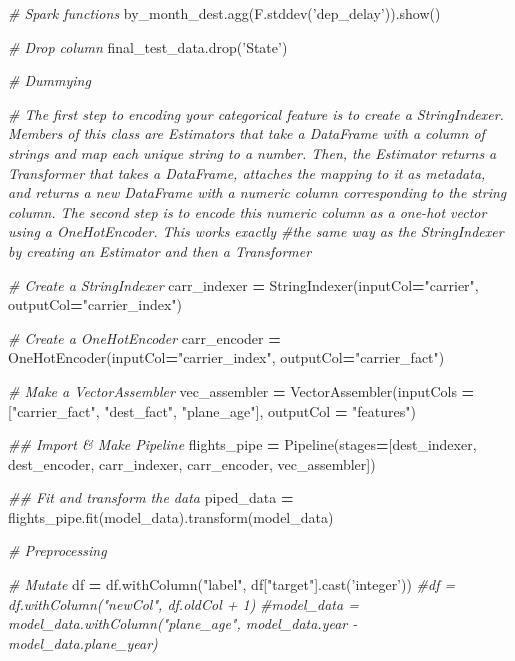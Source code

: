 \documentclass[]{book}
\newenvironment{Shaded}{\begin{snugshade}}{\end{snugshade}}
\newcommand{\CommentTok}[1]{\textcolor[rgb]{0.56,0.35,0.01}{\textit{#1}}}
\newcommand{\NormalTok}[1]{#1}
\newcommand{\OperatorTok}[1]{\textcolor[rgb]{0.81,0.36,0.00}{\textbf{#1}}}
\newcommand{\StringTok}[1]{\textcolor[rgb]{0.31,0.60,0.02}{#1}}
\begin{document}
\begin{Shaded}
\begin{Highlighting}[]
\CommentTok{# Spark functions}
\NormalTok{by_month_dest.agg(F.stddev(}\StringTok{'dep_delay'}\NormalTok{)).show()}

\CommentTok{# Drop column}
\NormalTok{final_test_data.drop(}\StringTok{'State'}\NormalTok{)}

\CommentTok{# Dummying}

\CommentTok{# The first step to encoding your categorical feature is to create a StringIndexer. Members of this class are Estimators that take a DataFrame with a column of strings and map each unique string to a number. Then, the Estimator returns a Transformer that takes a DataFrame, attaches the mapping to it as metadata, and returns a new DataFrame with a numeric column corresponding to the string column. The second step is to encode this numeric column as a one-hot vector using a OneHotEncoder. This works exactly #the same way as the StringIndexer by creating an Estimator and then a Transformer}

\CommentTok{# Create a StringIndexer}
\NormalTok{carr_indexer }\OperatorTok{=}\NormalTok{ StringIndexer(inputCol}\OperatorTok{=}\StringTok{"carrier"}\NormalTok{, outputCol}\OperatorTok{=}\StringTok{"carrier_index"}\NormalTok{)}

\CommentTok{# Create a OneHotEncoder}
\NormalTok{carr_encoder }\OperatorTok{=}\NormalTok{ OneHotEncoder(inputCol}\OperatorTok{=}\StringTok{"carrier_index"}\NormalTok{, outputCol}\OperatorTok{=}\StringTok{"carrier_fact"}\NormalTok{)}

\CommentTok{# Make a VectorAssembler}
\NormalTok{vec_assembler }\OperatorTok{=}\NormalTok{ VectorAssembler(inputCols }\OperatorTok{=}\NormalTok{ [}\StringTok{"carrier_fact"}\NormalTok{, }\StringTok{"dest_fact"}\NormalTok{, }\StringTok{"plane_age"}\NormalTok{], outputCol }\OperatorTok{=} \StringTok{"features"}\NormalTok{)}

\CommentTok{## Import & Make Pipeline}
\NormalTok{flights_pipe }\OperatorTok{=}\NormalTok{ Pipeline(stages}\OperatorTok{=}\NormalTok{[dest_indexer, dest_encoder, carr_indexer, carr_encoder, vec_assembler])}

\CommentTok{## Fit and transform the data}
\NormalTok{piped_data }\OperatorTok{=}\NormalTok{ flights_pipe.fit(model_data).transform(model_data)}

\CommentTok{# Preprocessing}

\CommentTok{# Mutate}
\NormalTok{df }\OperatorTok{=}\NormalTok{ df.withColumn(}\StringTok{"label"}\NormalTok{, df[}\StringTok{"target"}\NormalTok{].cast(}\StringTok{'integer'}\NormalTok{))}
\CommentTok{#df = df.withColumn("newCol", df.oldCol + 1)}
\CommentTok{#model_data = model_data.withColumn("plane_age", model_data.year - model_data.plane_year)}


\end{Highlighting}
\end{Shaded}
\end{document}
